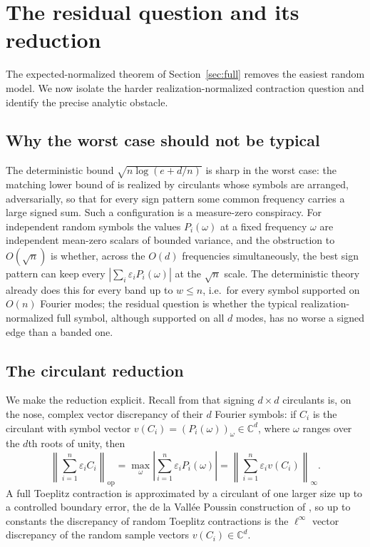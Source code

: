 \documentclass[11pt]{amsart}
\numberwithin{equation}{section}
\theoremstyle{definition}
\theoremstyle{remark}
\newcommand{\C}{\mathbb C}
\newcommand{\op}{\mathrm{op}}
\newcommand{\norm}[1]{\left\lVert #1\right\rVert}
\newcommand{\abs}[1]{\left\lvert #1\right\rvert}
\newcommand{\eps}{\varepsilon}
\begin{document}
\section{The residual question and its reduction}\label{sec:conjecture}

The expected-normalized theorem of Section~\ref{sec:full} removes the easiest
random model. We now isolate the harder realization-normalized contraction
question and identify the precise analytic obstacle.

\subsection{Why the worst case should not be typical}

The deterministic bound $\sqrt{n\log(e+d/n)}$ is sharp in the worst case: the
matching lower bound of \cite[Thm.~5.30]{Shmalo-paper12} is realized by
circulants whose symbols are arranged, adversarially, so that for every sign
pattern some common frequency carries a large signed sum. Such a configuration is
a measure-zero conspiracy. For independent random symbols the values
$P_i(\omega)$ at a fixed frequency $\omega$ are independent mean-zero scalars of
bounded variance, and the obstruction to $O(\sqrt n)$ is whether, across the
$O(d)$ frequencies simultaneously, the best sign pattern can keep every
$\abs{\sum_i\eps_iP_i(\omega)}$ at the $\sqrt n$ scale. The deterministic theory
already does this for every band up to $w\le n$, i.e.\ for every symbol supported
on $O(n)$ Fourier modes; the residual question is whether the typical
realization-normalized full symbol, although supported on all $d$ modes, has no
worse a signed edge than a banded one.

\subsection{The circulant reduction}

We make the reduction explicit. Recall from \cite[\S5]{Shmalo-paper12} that
signing $d\times d$ circulants is, on the nose, complex vector discrepancy of
their $d$ Fourier symbols: if $C_i$ is the circulant with symbol vector
$v(C_i)=(P_i(\omega))_{\omega}\in\C^d$, where $\omega$ ranges over the $d$th
roots of unity, then
\[
\norm{\sum_{i=1}^n\eps_iC_i}_{\op}
=\max_{\omega}\abs{\sum_{i=1}^n\eps_iP_i(\omega)}
=\norm{\sum_{i=1}^n\eps_iv(C_i)}_\infty .
\]
A full Toeplitz contraction is approximated by a circulant of one larger size up
to a controlled boundary error, the de la Vall\'ee Poussin construction of
\cite[Rem.~5.12]{Shmalo-paper12}, so up to constants the discrepancy of random
Toeplitz contractions is the $\ell^\infty$ vector discrepancy of the random
sample vectors $v(C_i)\in\C^d$.
\end{document}
